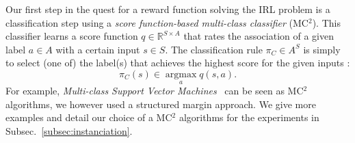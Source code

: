 \documentclass[smallextended]{svjour3}
\newcommand{\argmax}{\operatorname*{argmax}} %
\begin{document}
Our first step in the quest for a reward function solving the IRL problem is a classification step using a \emph{score function-based multi-class classifier} (MC$^2$). This classifier learns a score function $q\in\mathbb{R}^{S\times A}$ that rates the association of a given label $a\in A$ with a certain input $s\in S$. The classification rule $\pi_C\in A^S$ is simply to select (one of) the label(s) that achieves the highest score for the given inputs :
\begin{equation}
  \label{eq:greedy2}
\pi_C(s) \in \argmax_a q(s,a).
\end{equation}
For example, \emph{Multi-class Support Vector Machines}~\cite{guermeur2011generic} can be seen as MC$^2$ algorithms, we however used a structured margin approach. We give more examples and detail our choice of a MC$^2$ algorithms for the experiments in Subsec.~\ref{subsec:instanciation}. 
\end{document}
